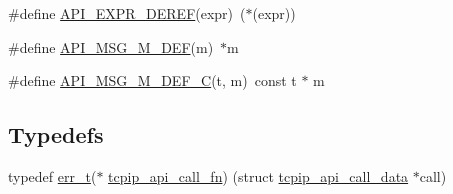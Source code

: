 \begin{DoxyCompactItemize}
\item 
\#define \hyperlink{openmote-cc2538_2lwip_2src_2include_2lwip_2priv_2tcpip__priv_8h_a4b2322aa0c1906f84f16acf359f06a92}{A\+P\+I\+\_\+\+E\+X\+P\+R\+\_\+\+D\+E\+R\+EF}(expr)~($\ast$(expr))
\item 
\#define \hyperlink{openmote-cc2538_2lwip_2src_2include_2lwip_2priv_2tcpip__priv_8h_ad299ce8f259fb9f1f6c5c5a812f1bc58}{A\+P\+I\+\_\+\+M\+S\+G\+\_\+\+M\+\_\+\+D\+EF}(m)~$\ast$m
\item 
\#define \hyperlink{openmote-cc2538_2lwip_2src_2include_2lwip_2priv_2tcpip__priv_8h_a3a9d654eb42f26b409d1386d162f1e31}{A\+P\+I\+\_\+\+M\+S\+G\+\_\+\+M\+\_\+\+D\+E\+F\+\_\+C}(t,  m)~const t $\ast$ m
\end{DoxyCompactItemize}
\subsection*{Typedefs}
\begin{DoxyCompactItemize}
\item 
typedef \hyperlink{group__infrastructure__errors_gaf02d9da80fd66b4f986d2c53d7231ddb}{err\+\_\+t}($\ast$ \hyperlink{openmote-cc2538_2lwip_2src_2include_2lwip_2priv_2tcpip__priv_8h_aa7ecde8c8d8012fe5c498f7ee58f9458}{tcpip\+\_\+api\+\_\+call\+\_\+fn}) (struct \hyperlink{structtcpip__api__call__data}{tcpip\+\_\+api\+\_\+call\+\_\+data} $\ast$call)
\end{DoxyCompactItemize}
